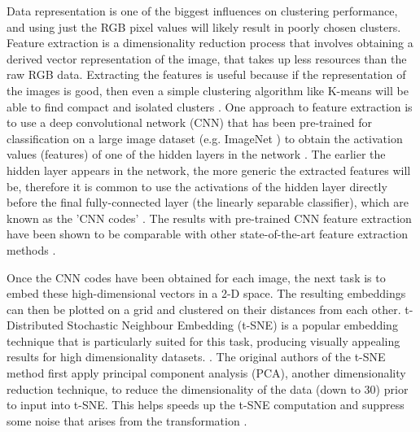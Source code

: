 \documentclass[10pt,twocolumn,letterpaper]{article}
\begin{document}
 Data representation is one of the biggest influences on clustering performance, and using just the RGB pixel values will likely result in poorly chosen clusters. Feature extraction is a dimensionality reduction process that involves obtaining a derived vector representation of the image, that takes up less resources than the raw RGB data. Extracting the features is useful because if the representation of the images is good, then even a simple clustering algorithm like K-means will be able to find compact and isolated clusters \cite{JAIN2010651}. One approach to feature extraction is to use a deep convolutional network (CNN) that has been pre-trained for classification on a large image dataset (e.g. ImageNet \cite{imagenet_cvpr09}) to obtain the activation values (features) of one of the hidden layers in the network \cite{sharif2014cnn}\cite{karpathy_2018_transfer}. The earlier the hidden layer appears in the network, the more generic the extracted features will be, therefore it is common to use the activations of the hidden layer directly before the final fully-connected layer (the linearly separable classifier), which are known as the 'CNN codes' \cite{karpathy_2018_transfer}. The results with pre-trained CNN feature extraction have been shown to be comparable with other state-of-the-art feature extraction methods \cite{sharif2014cnn}.
 
 Once the CNN codes have been obtained for each image, the next task is to embed these high-dimensional vectors in a 2-D space. The resulting embeddings can then be plotted on a grid and clustered on their distances from each other. t-Distributed Stochastic Neighbour Embedding (t-SNE) is a popular embedding technique that is particularly suited for this task, producing visually appealing results for high dimensionality datasets. \cite{maaten2008visualizing}\cite{karpathy_2018_visualizing}. The original authors of the t-SNE method first apply principal component analysis (PCA), another dimensionality reduction technique, to reduce the dimensionality of the data (down to 30) prior to input into t-SNE. This helps speeds up the t-SNE computation and suppress some noise that arises from the transformation \cite{maaten2008visualizing}.
\end{document}
